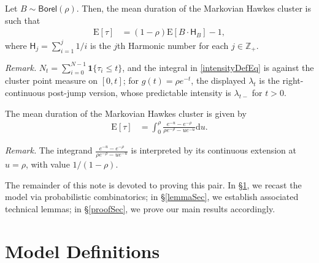 \documentclass[opre,nonblindrev]{informs3_no_remark}
\newcommand{\E}[1]{{\mathrm{E}\left[#1\right]}}
\begin{document}
\begin{theorem}\label{meanIdThm1}
Let $B \sim \mathsf{Borel}(\rho)$. Then, the mean duration of the Markovian Hawkes cluster is such that
\begin{align}
\E{\tau}
&=
\left(1-\rho\right)
\E{B \cdot \mathsf{H}_B}
-
1
,
\end{align}
where $\mathsf{H}_j = \sum_{i=1}^j 1/i$ is the $j$th Harmonic number for each $j \in \mathbb{Z}_+$.
\end{theorem}

\noindent\textit{Remark.} $N_t=\sum_{i=0}^{N-1}\mathbf{1}\{\tau_i\leq t\}$, and the integral in \eqref{intensityDefEq} is against the cluster point measure on $[0,t]$; for $g(t)=\rho e^{-t}$, the displayed $\lambda_t$ is the right-continuous post-jump version, whose predictable intensity is $\lambda_{t-}$ for $t>0$.


\begin{corollary} \label{corIdThm1}
The mean duration of the Markovian Hawkes cluster is given by
\begin{align}
\E{\tau}
&=
\int_0^\rho
\frac{e^{-u} - e^{-\rho}}{\rho e^{-\rho} - u e^{-u}}\mathrm{d}u
.
\end{align}
\end{corollary}

\noindent\textit{Remark.} The integrand $\frac{e^{-u}-e^{-\rho}}{\rho e^{-\rho}-u e^{-u}}$ is interpreted by its continuous extension at $u=\rho$, with value $1/(1-\rho)$.


\noindent The remainder of this note is devoted to proving this pair. 
In \S\ref{modelSec}, we recast the model via probabilistic combinatorics; in \S\ref{lemmaSec}, we establish associated technical lemmas; in \S\ref{proofSec}, we prove our main results accordingly.

\section{Model Definitions}\label{modelSec}
\end{document}
